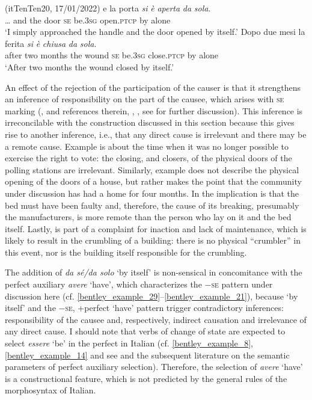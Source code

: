 \documentclass[output=paper,colorlinks,citecolor=brown
]{langscibook}
\begin{document}
\ea \label{bentley_example_33}(itTenTen20, 17/01/2022)
    \ea \label{bentley_example_33a}
     	e				la		porta	\textit{si}		\textit{è}							\textit{aperta}				\textit{da} \textit{sola}.	\\
    {\ldots} and	the	door		\textsc{se}		be.3\textsc{sg}		open.\textsc{ptcp}	by	alone \\
    \glt 					‘I simply approached the handle and the door opened by itself.’
    \ex \label{bentley_example_33b}
    \gll Dopo		due	mesi			la		ferita			\textit{si} 		\textit{è }						\textit{chiusa} 			\textit{da} \textit{sola}. \\
				after			two	months	the	wound		\textsc{se}		be.3\textsc{sg}		close.\textsc{ptcp}	by	alone\\
    \glt 				‘After two months the wound closed by itself.’
    \z
\z

An effect of the rejection of the participation of the causer is that it strengthens an inference of responsibility on the part of the causee, which arises with \textsc{se} marking (\cite{zribi1987reflexivite}, and references therein, \cite{kailuweit2012construcciones}, \cite{martin2014anticausatives}, see  for further discussion). This inference is irreconcilable with the construction discussed in this section because this gives rise to another inference, i.e., that any direct cause is irrelevant and there may be a remote cause. Example  is about the time when it was no longer possible to exercise the right to vote: the closing, and closers, of the physical doors of the polling stations are irrelevant. Similarly, example  does not describe the physical opening of the doors of a house, but rather makes the point that the community under discussion has had a home for four months. In  the implication is that the bed must have been faulty and, therefore, the cause of its breaking, presumably the manufacturers, is more remote than the person who lay on it and the bed itself. Lastly,  is part of a complaint for inaction and lack of maintenance, which is likely to result in the crumbling of a building: there is no physical “crumbler” in this event, nor is the building itself responsible for the crumbling.

The addition of\textit{ da sé/da solo} ‘by itself’ is non-sensical in concomitance with the perfect
auxiliary \textit{avere} ‘have’, which characterizes the −\textsc{se} pattern under discussion here
(cf. \ref{bentley_example_29}--\ref{bentley_example_21}), because ‘by itself’ and the {−\textsc{se}, +perfect ‘have’} pattern trigger contradictory inferences: responsibility of the causee and, respectively, indirect causation and irrelevance of any direct cause. I should note that verbs of change of state are expected to select \textit{essere} ‘be’ in the perfect in Italian (cf. \ref{bentley_example_8}, \ref{bentley_example_14} and see \cite{perlmutter1989multiattachment} and the subsequent literature on the semantic parameters of perfect auxiliary selection). Therefore, the selection of \textit{avere }‘have’ is a constructional feature, which is not predicted by the general rules of the morphosyntax of Italian.
\end{document}
